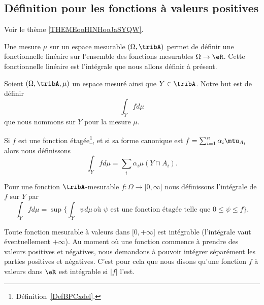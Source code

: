\subsection{Définition pour les fonctions à valeurs positives}

Voir le thème \ref{THEMEooHINHooJaSYQW}.

Une mesure \( \mu\) sur un espace mesurable \( (\Omega,\tribA)\) permet de définir une fonctionnelle linéaire sur l'ensemble des fonctions mesurables \( \Omega\to \eR\). Cette fonctionnelle linéaire est l'intégrale que nous allons définir à présent.

\begin{definition}  \label{DefTVOooleEst}
	Soient \( (\Omega,\tribA,\mu)\) un espace mesuré ainsi que \( Y\in\tribA\). Notre but est de définir
	\begin{equation}
		\int_Yfd\mu
	\end{equation}
	que nous nommons  sur \( Y\) pour la mesure \( \mu\).
	\begin{subproof}
		Si \( f\) est une fonction étagée\footnote{Définition~\ref{DefBPCxdel}.}, et si sa forme canonique est \( f=\sum_{i=1}^n\alpha_i\mtu_{A_i}\) alors nous définissons
		\begin{equation}        \label{EqooGAFMooZLzjPs}
			\int_Yfd\mu=\sum_i\alpha_i\mu(Y\cap A_i).
		\end{equation}

		Pour une fonction \( \tribA\)-mesurable \( f\colon \Omega\to \mathopen[ 0 , \infty \mathclose]\) nous définissons l'intégrale de \( f\) sur \( Y\) par
		\begin{equation}        \label{EqDefintYfdmu}
			\int_Yfd\mu=\sup\Big\{ \int_Y\psi d\mu\,\text{où } \psi\text{ est une fonction étagée telle que } 0\leq \psi\leq f \Big\}.
		\end{equation}

	\end{subproof}
\end{definition}

\begin{remark}
	Toute fonction mesurable à valeurs dans \(  \mathopen[ 0 , +\infty \mathclose]   \) est intégrable (l'intégrale vaut éventuellement \( +\infty\)). Au moment où une fonction commence à prendre des valeurs positives et négatives, nous demandons à pouvoir intégrer séparément les parties positives et négatives. C'est pour cela que nous disons qu'une fonction \( f\) à valeurs dans \( \eR\) est intégrable si \( | f |\) l'est.
\end{remark}

